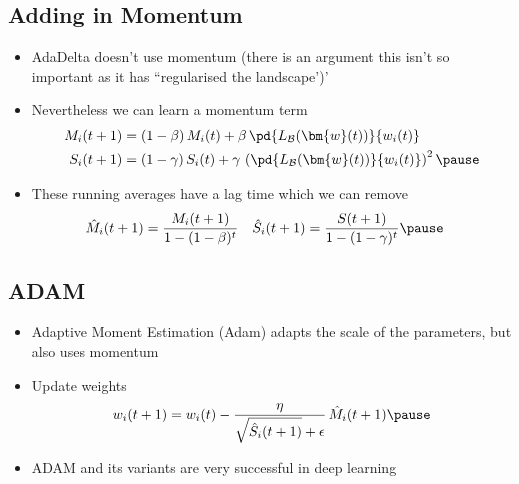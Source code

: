 
\begin{slide}
\section[-2]{Adding in Momentum}

\begin{PauseHighLight}
  \begin{itemize}
  \item AdaDelta doesn't use momentum (there is an argument this isn't
    so important as it has ``regularised the landscape')'\pause
  \item Nevertheless we can learn a momentum term
    {\small
    \begin{align*}
      M_i(t+1)
      &= (1-\beta)\,M_i(t) + \beta \,
        \pd{L_{\mathcal{B}}(\bm{w}(t))}{w_i(t)}
      \\
      S_i(t+1)
      &= (1-\gamma)\,S_i(t) + \gamma \,
        \left( \pd{L_{\mathcal{B}}(\bm{w}(t))}{w_i(t)} \right)^2\pause
    \end{align*}}
  \item These running averages have a lag time which we can remove
    \begin{align*}
      \hat{M}_i(t+1) &= \frac{M_i(t+1)}{1-(1-\beta)^t}
      &
        \hat{S}_i(t+1) &= \frac{S(t+1)}{1-(1-\gamma)^t}\pause
    \end{align*}
 \end{itemize}
\end{PauseHighLight}

\end{slide}


\begin{slide}
\section{ADAM}

\begin{PauseHighLight}
  \begin{itemize}
  \item Adaptive Moment Estimation (Adam) adapts the scale of the
    parameters, but also uses momentum\pause
  \item Update weights
    \begin{align*}
      w_i(t+1) = w_i(t) - \frac{\eta}{\sqrt{\hat{S}_i(t+1)} + \epsilon}\,
      \hat{M}_i(t+1)\pause
    \end{align*}
  \item ADAM and its variants are very successful in deep learning\pause
  \end{itemize}
\end{PauseHighLight}

\end{slide}

